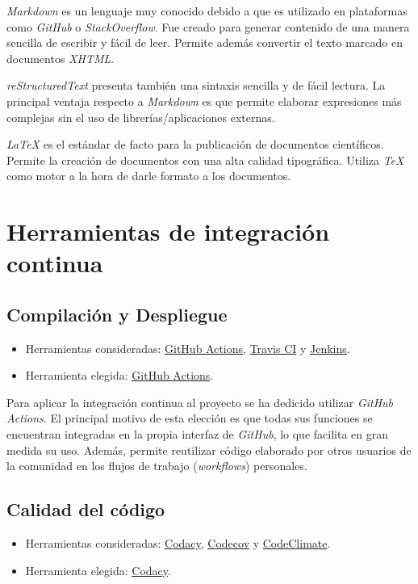 \emph{Markdown} es un lenguaje muy conocido debido a que es utilizado en
plataformas como \emph{GitHub} o \emph{StackOverflow}. Fue creado para
generar contenido de una manera sencilla de escribir y fácil de leer.
Permite además convertir el texto marcado en documentos \emph{XHTML}.

\emph{reStructuredText} presenta también una sintaxis sencilla y de
fácil lectura. La principal ventaja respecto a \emph{Markdown} es que
permite elaborar expresiones más complejas sin el uso de
librerías/aplicaciones externas.

\emph{LaTeX} es el estándar de facto para la publicación de documentos
científicos. Permite la creación de documentos con una alta calidad
tipográfica. Utiliza \emph{TeX} como motor a la hora de darle formato a
los documentos.

\section{Herramientas de integración continua}

\subsection{Compilación y Despliegue}

\begin{itemize}
\tightlist
\item
  Herramientas consideradas:
  \href{https://github.com/features/actions}{GitHub Actions},
  \href{https://travis-ci.org/}{Travis CI} y
  \href{https://jenkins.io/}{Jenkins}.
\item
  Herramienta elegida: \href{https://github.com/features/actions}{GitHub
  Actions}.
\end{itemize}

Para aplicar la integración continua al proyecto se ha dedicido utilizar
\emph{GitHub Actions}. El principal motivo de esta elección es que todas
sus funciones se encuentran integradas en la propia interfaz de
\emph{GitHub}, lo que facilita en gran medida su uso. Además, permite
reutilizar código elaborado por otros usuarios de la comunidad en los
flujos de trabajo (\emph{workflows}) personales.

\subsection{Calidad del código}

\begin{itemize}
\tightlist
\item
  Herramientas consideradas: \href{https://codacy.com}{Codacy},
  \href{https://codecov.io/}{Codecov} y
  \href{https://codeclimate.com/}{CodeClimate}.
\item
  Herramienta elegida: \href{https://codacy.com}{Codacy}.
\end{itemize}


